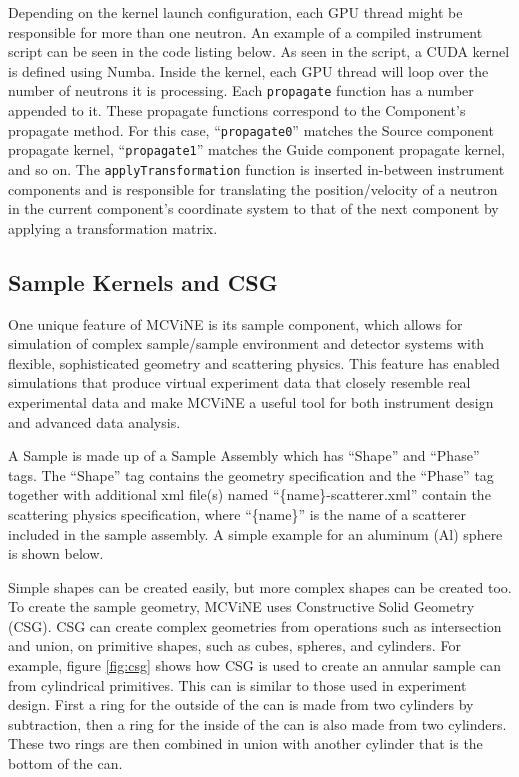 Depending on the kernel launch configuration, each GPU thread might be responsible for more than one neutron. An example of a compiled instrument script can be seen in the code listing below. As seen in the script, a CUDA kernel is defined using Numba. Inside the kernel, each GPU thread will loop over the number of neutrons it is processing. Each \texttt{propagate} function has a number appended to it. These propagate functions correspond to the Component's propagate method. For this case, ``\texttt{propagate0}'' matches the Source component propagate kernel, ``\texttt{propagate1}'' matches the Guide component propagate kernel, and so on. The \texttt{applyTransformation} function is inserted in-between instrument components and is responsible for translating the position/velocity of a neutron in the current component's coordinate system to that of the next component by applying a transformation matrix.

\vspace{1mm}

\vspace{1mm}

\subsection{Sample Kernels and CSG}

One unique feature of MCViNE is its sample component, which allows for simulation of complex sample/sample environment and detector systems with flexible, sophisticated geometry and scattering physics. 
This feature has enabled simulations that produce virtual experiment data that closely resemble real experimental data and make MCViNE a useful tool for both instrument design and advanced data analysis. 

A Sample is made up of a Sample Assembly which has ``Shape'' and ``Phase'' tags. 
The ``Shape'' tag contains the geometry specification and the ``Phase'' tag together with additional xml file(s) named ``\{name\}-scatterer.xml'' contain the scattering physics specification, where ``\{name\}'' is the name of a scatterer included in the sample assembly. A simple example for an aluminum (Al) sphere is shown below. 

\vspace{1mm}

\vspace{1mm}

Simple shapes can be created easily, but more complex shapes can be created too.
To create the sample geometry, MCViNE uses Constructive Solid Geometry (CSG). 
CSG can create complex geometries from operations such as intersection and union, on primitive shapes, such as cubes, spheres, and cylinders. 
For example, figure \ref{fig:csg} shows how CSG is used to create an annular sample can from cylindrical primitives. This can is similar to those used in experiment design\cite{PhysRevB.107.094511}.
First a ring for the outside of the can is made from two cylinders by subtraction, then a ring for the inside of the can is also made from two cylinders.  These two rings are then combined in union with another cylinder that is the bottom of the can. 

